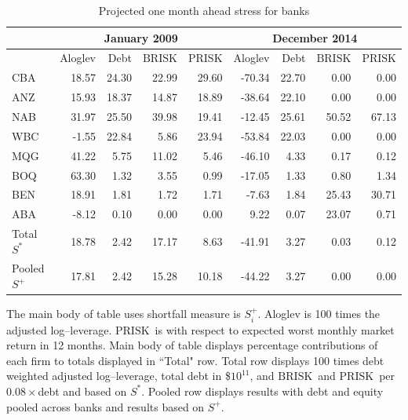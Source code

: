 \documentclass[12pt]{article}
\newcommand{\E}{\mathrm{E}}
\newcommand{\br}{\ensuremath{\mathrm{BRISK}}}
\newcommand{\pr}{\ensuremath{\mathrm{PRISK}}}
\begin{document}
\begin{table}[ht]
\caption{Projected one month ahead  stress for banks}
\label{twodates}
\centering
\begin{threeparttable}
\small
\vspace{4mm}
\begin{tabular}{l|rrrr|rrrr}
\hline
&\multicolumn{4}{c|}{January 2009}&\multicolumn{4}{c}{December 2014}\\
  \hline
   & Aloglev& Debt & \br  & \pr  & Aloglev & Debt  &\br & \pr\\  
  \hline
CBA & 18.57 & 24.30 & 22.99 & 29.60 & -70.34 & 22.70 & 0.00 & 0.00 \\ 
  ANZ & 15.93 & 18.37 & 14.87 & 18.89 & -38.64 & 22.10 & 0.00 & 0.00 \\ 
  NAB & 31.97 & 25.50 & 39.98 & 19.41 & -12.45 & 25.61 & 50.52 & 67.13 \\ 
  WBC & -1.55 & 22.84 & 5.86 & 23.94 & -53.84 & 22.03 & 0.00 & 0.00 \\ 
  MQG & 41.22 & 5.75 & 11.02 & 5.46 & -46.10 & 4.33 & 0.17 & 0.12 \\ 
  BOQ & 63.30 & 1.32 & 3.55 & 0.99 & -17.05 & 1.33 & 0.80 & 1.34 \\ 
  BEN & 18.91 & 1.81 & 1.72 & 1.71 & -7.63 & 1.84 & 25.43 & 30.71 \\ 
  ABA & -8.12 & 0.10 & 0.00 & 0.00 & 9.22 & 0.07 & 23.07 & 0.71 \\ 
  \hline
  Total $S^*$ & 18.78 & 2.42 & 17.17 & 8.63 & -41.91 & 3.27 & 0.03 & 0.12 \\ 
  Pooled $S^+$ & 17.81 & 2.42 & 15.28 & 10.18 & -44.22 & 3.27 & 0.00 & 0.00 \\ \hline
\end{tabular}
\begin{tablenotes}
\item[]The main body of table uses shortfall measure  is $S_i^+$. Aloglev is 100 times the adjusted log--leverage. \pr\  is with respect to expected worst monthly market return  in 12 months.  Main body of table displays percentage contributions of each firm to totals displayed in ``Total" row.   Total row displays 100 times debt weighted adjusted log--leverage, total debt in \$$10^{11}$, and \br\  and \pr\  per $0.08\times$debt and based on $S^*$.  Pooled row displays results with debt and equity pooled across banks and results based on $S^+$. 
\end{tablenotes}
\end{threeparttable}
\end{table}
\normalsize
\end{document}
